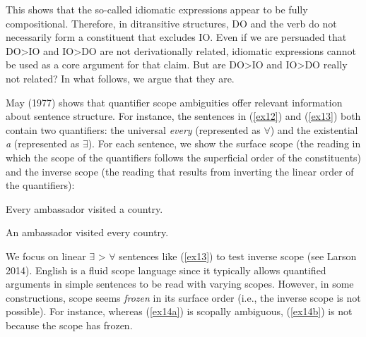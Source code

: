 \documentclass[output=paper,modfonts,nonflat]{langsci/langscibook}
\begin{document}
\ea \label{ex11}
	\label{ex11a}
	\label{ex11b}
	\z
\z

This shows that the so-called idiomatic expressions appear to be fully compositional. Therefore, in ditransitive structures, DO and the verb do not necessarily form a constituent that excludes IO. Even if we are persuaded that DO>IO and IO>DO are not derivationally related, idiomatic expressions cannot be used as a core argument for that claim. But are DO>IO and IO>DO really not related? In what follows, we argue that they are.

May (1977) shows that quantifier scope ambiguities offer relevant information about sentence structure. For instance, the sentences in (\ref{ex12}) and (\ref{ex13}) both contain two quantifiers: the universal \textit{every} (represented as $\forall$) and the existential \textit{a} (represented as $\exists$). For each sentence, we show the surface scope (the reading in which the scope of the quantifiers follows the superficial order of the constituents) and the inverse scope (the reading that results from inverting the linear order of the quantifiers):

\ea \label{ex12} Every ambassador visited a country.
	\z
\z

\ea \label{ex13} An ambassador visited every country.
	\z
\z

We focus on linear $\exists$ > $\forall$ sentences like (\ref{ex13}) to test inverse scope (see Larson 2014). English is a fluid scope language since it typically allows quantified arguments in simple sentences to be read with varying scopes. However, in some constructions, scope seems \textit{frozen} in its surface order (i.e., the inverse scope is not possible). For instance, whereas (\ref{ex14a}) is scopally ambiguous, (\ref{ex14b}) is not because the scope has frozen.
\end{document}
